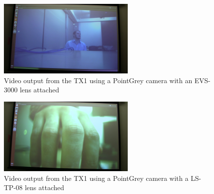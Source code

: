 \documentclass[letterpaper,10pt,titlepage]{IEEEtran}
\begin{document}
\begin{figure}[!ht]
  \caption{Video output from the TX1 using a PointGrey camera with an EVS-3000 lens attached}
	  \centering
		    \includegraphics[width=0.6\textwidth,natwidth=610,natheight=642]{images/vlcsnap-2016-02-11-17h42m53s150.png}
				\end{figure}
\begin{figure}[!ht]
  \caption{Video output from the TX1 using a PointGrey camera with a LS-TP-08 lens attached}
	  \centering
		    \includegraphics[width=0.6\textwidth,natwidth=610,natheight=642]{images/vlcsnap-2016-02-11-17h42m30s486.png}
				\end{figure}

   
\end{document}
